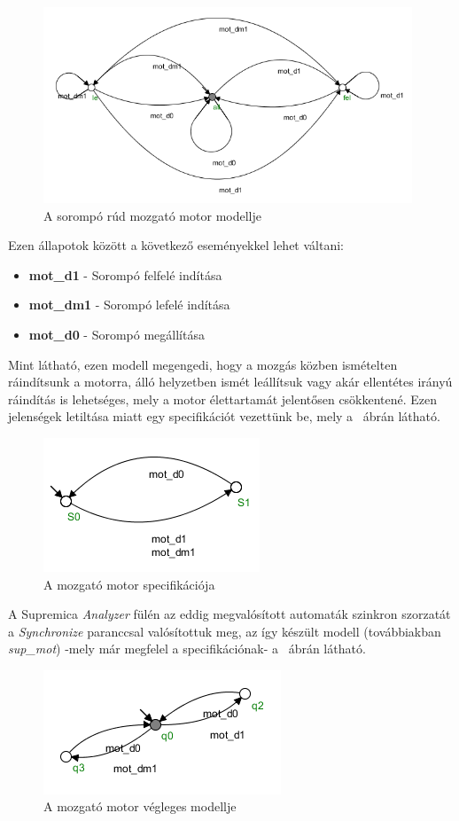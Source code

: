\begin{figure}
	\centering
	\includegraphics[width=110mm,keepaspectratio]{figures/2m03/b_motor.png}
	\caption{A sorompó rúd mozgató motor modellje}
	\label{fig:Motor}
\end{figure}
Ezen állapotok között a következő eseményekkel lehet váltani:
\begin{itemize}
	\item \textbf{mot\_d1} - Sorompó felfelé indítása
	\item \textbf{mot\_dm1} - Sorompó lefelé indítása
	\item \textbf{mot\_d0} - Sorompó megállítása
\end{itemize}
Mint látható, ezen modell megengedi, hogy a mozgás közben ismételten ráindítsunk a motorra, álló helyzetben ismét leállítsuk vagy akár ellentétes irányú ráindítás is lehetséges, mely a motor élettartamát jelentősen csökkentené. Ezen jelenségek letiltása miatt egy specifikációt vezettünk be, mely a ~ábrán látható.

\begin{figure}
	\centering
	\includegraphics[keepaspectratio]{figures/2m03/b_spec_motor.png}
	\caption{A mozgató motor specifikációja}
	\label{fig:SpecMot}
\end{figure}
A Supremica \textit{Analyzer} fülén az eddig megvalósított automaták szinkron szorzatát a \textit{Synchronize} paranccsal valósítottuk meg, az így készült modell (továbbiakban \textit{sup\_mot}) -mely már megfelel a specifikációnak- a ~ábrán látható.
\begin{figure}
	\centering
	\includegraphics[keepaspectratio]{figures/2m03/b_supmot.png}
	\caption{A mozgató motor végleges modellje}
	\label{fig:SupMot}
\end{figure}


